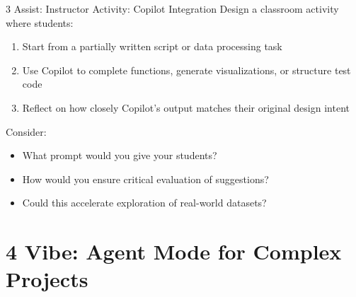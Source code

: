 \documentclass[xcolor=dvipsnames, aspectratio=169]{beamer}
\begin{document}
\begin{frame}{3 Assist: Instructor Activity: Copilot Integration}
  Design a classroom activity where students:
  \begin{enumerate}
    \item Start from a partially written script or data processing task
    \item Use Copilot to complete functions, generate visualizations, or structure test code
    \item Reflect on how closely Copilot's output matches their original design intent
  \end{enumerate}
  
  Consider:
  \begin{itemize}
    \item What prompt would you give your students?
    \item How would you ensure critical evaluation of suggestions?
    \item Could this accelerate exploration of real-world datasets?
  \end{itemize}
\end{frame}

\section{4 Vibe: Agent Mode for Complex Projects}
\end{document}
